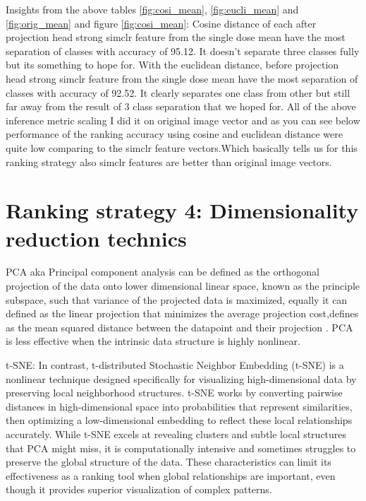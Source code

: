 Insights from the above tables \ref{fig:cosi_mean}, \ref{fig:eucli_mean} and \ref{fig:orig_mean} and figure \ref{fig:cosi_mean}: Cosine distance of each after projection head strong simclr feature from the single dose mean have the most separation of classes with accuracy of 95.12. It doesn't separate three classes fully but its something to hope for. With the euclidean distance, before projection head strong simclr feature from the single dose mean have the most separation of classes with accuracy of 92.52. It clearly  separates one class from other but still far away from the result of 3 class separation that we hoped for.
All of the above inference metric scaling  I did it on original image vector and as you can see below performance of the ranking accuracy using cosine and euclidean distance were quite low comparing to the simclr feature vectors.Which basically tells us for this ranking strategy also simclr features are better than original image vectors.



\section{ Ranking strategy 4: Dimensionality reduction technics}



PCA  aka Principal component analysis can be defined as the orthogonal projection of the data onto lower dimensional linear space, known as the principle subspace, such that variance of the projected data is maximized, equally it can defined as the linear projection that minimizes the average projection cost,defines as the mean squared distance between the datapoint and their projection \cite{bishop:2006:PRML}.  PCA is less effective when the intrinsic data structure is highly nonlinear.

t-SNE: In contrast, t-distributed Stochastic Neighbor Embedding (t-SNE) is a nonlinear technique designed specifically for visualizing high-dimensional data by preserving local neighborhood structures. t-SNE works by converting pairwise distances in high-dimensional space into probabilities that represent similarities, then optimizing a low-dimensional embedding to reflect these local relationships accurately. While t-SNE excels at revealing clusters and subtle local structures that PCA might miss, it is computationally intensive and sometimes struggles to preserve the global structure of the data. These characteristics can limit its effectiveness as a ranking tool when global relationships are important, even though it provides superior visualization of complex patterns.

